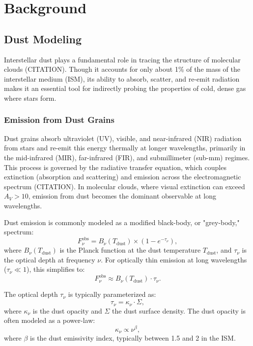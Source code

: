 \chapter{Background}
\label{chap:background}

\section{Dust Modeling}

Interstellar dust plays a fundamental role in tracing the structure of molecular clouds (CITATION). Though it accounts for only about 1\% of the mass of the interstellar medium (ISM), its ability to absorb, scatter, and re-emit radiation makes it an essential tool for indirectly probing the properties of cold, dense gas where stars form.

\subsection{Emission from Dust Grains}

Dust grains absorb ultraviolet (UV), visible, and near-infrared (NIR) radiation from stars and re-emit this energy thermally at longer wavelengths, primarily in the mid-infrared (MIR), far-infrared (FIR), and submillimeter (sub-mm) regimes. This process is governed by the radiative transfer equation, which couples extinction (absorption and scattering) and emission across the electromagnetic spectrum (CITATION). In molecular clouds, where visual extinction can exceed $A_V > 10$, emission from dust becomes the dominant observable at long wavelengths.

Dust emission is commonly modeled as a modified black-body, or "grey-body," spectrum:
\[
F_\nu^{\mathrm{obs}} = B_\nu(T_\mathrm{dust}) \times \left(1 - e^{-\tau_\nu}\right),
\]
where $B_\nu(T_\mathrm{dust})$ is the Planck function at the dust temperature $T_\mathrm{dust}$, and $\tau_\nu$ is the optical depth at frequency $\nu$. For optically thin emission at long wavelengths ($\tau_\nu \ll 1$), this simplifies to:
\[
F_\nu^{\mathrm{obs}} \approx B_\nu(T_\mathrm{dust}) \cdot \tau_\nu.
\]

The optical depth $\tau_\nu$ is typically parameterized as:
\[
\tau_\nu = \kappa_\nu \cdot \Sigma,
\]
where $\kappa_\nu$ is the dust opacity and $\Sigma$ the dust surface density. The dust opacity is often modeled as a power-law:
\[
\kappa_\nu \propto \nu^\beta,
\]
where $\beta$ is the dust emissivity index, typically between 1.5 and 2 in the ISM.

